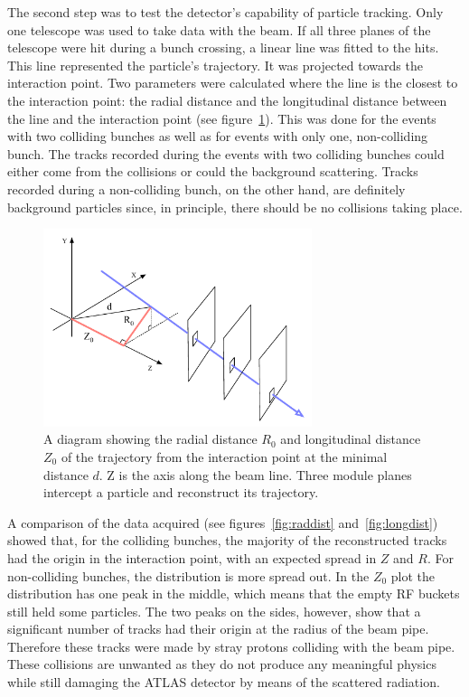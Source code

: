 The second step was to test the detector's capability of particle tracking. Only one telescope was used to take data with the beam. If all three planes of the telescope were hit during a bunch crossing, a linear line was fitted to the hits. This line represented the particle's trajectory. It was projected towards the interaction point. Two parameters were calculated where the line is the closest to the interaction point: the radial distance and the longitudinal distance between the line and the interaction point (see figure~\ref{fig:z-r-distance}). This was done for the events with two colliding bunches as well as for events with only one, non-colliding bunch. The tracks recorded during the events with two colliding bunches could either come from the collisions or could the background scattering. Tracks recorded during a non-colliding bunch, on the other hand, are definitely background particles since, in principle, there should be no collisions taking place. 
\begin{figure}[!t]
\centering
\includegraphics[width=0.7\textwidth]{../scripts/04_charge_monitoring/plots/z-r-distance}
\caption{A diagram showing the radial distance $R_\mathrm{0}$ and longitudinal distance $Z_\mathrm{0}$ of the trajectory from the interaction point at the minimal distance $d$. Z is the axis along the beam line. Three module planes intercept a particle and reconstruct its trajectory.}
\label{fig:z-r-distance}
\end{figure}

A comparison of the data acquired (see figures~\ref{fig:raddist} and~\ref{fig:longdist}) showed that, for the colliding bunches, the majority of the reconstructed tracks had the origin in the interaction point, with an expected spread in $Z$ and $R$. For non-colliding bunches, the distribution is more spread out. In the $Z_\mathrm{0}$ plot the distribution has one peak in the middle, which means that the empty RF buckets still held some particles. The two peaks on the sides, however, show that a significant number of tracks had their origin at the radius of the beam pipe. Therefore these tracks were made by stray protons colliding with the beam pipe. These collisions are unwanted as they do not produce any meaningful physics while still damaging the ATLAS detector by means of the scattered radiation.

